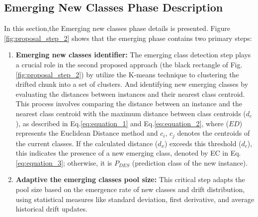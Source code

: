 \subsection{Emerging New Classes Phase Description}
\label{sec:emerging_phase}
In this section,the Emerging new classes phase details is presented. Figure \ref{fig:proposal_step_2} shows that the emerging phase contains two primary steps:
\begin{enumerate}
	\item \textbf{Emerging new classes identifier:} The emerging class detection step plays a crucial role in the second proposed approach (the black rectangle of Fig. \ref{fig:proposal_step_2}) by utilize the K-means technique to clustering the drifted chunk into a set of clusters. And identifying new emerging classes by evaluating the distances between instances and their nearest class centroid. This process involves comparing the distance between an instance and the nearest class centroid with the maximum distance between class centroids ($d_c$), as described in Eq.\ref{eq:equation_1} and Eq.\ref{eq:equation_2}, where (\( ED \)) represents the Euclidean Distance method and $c_i$, $c_j$ denotes the centroids of the current classes. If the calculated distance ($d_x$) exceeds this threshold ($d_c$), this indicates the presence of a new emerging class, denoted by EC in Eq. \ref{eq:equation_3}; otherwise, it is $P_{DES}$ (prediction class of the new instance).
	\item \textbf{Adaptive the emerging classes pool size:} This critical step adapts the pool size based on the emergence rate of new classes and drift distribution, using statistical measures like standard deviation, first derivative, and average historical drift updates.
\end{enumerate}

